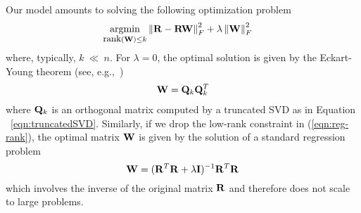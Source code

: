 Our model amounts to solving the following optimization problem
 \begin{align}
\label{eqn:reg-rank}
\underset{\mbox{\footnotesize rank}(\W) \le k}{\mathrm{argmin}} & \left \| \R - \R\W\right \|_F^2 + \lambda \left \|  \W \right \|_F^2
\end{align}
where, typically, $k\ \ll \ n$.
For $\lambda = 0$, the optimal solution is given by the Eckart-Young theorem (see, e.g.,~\citep{halko2011})
   \begin{align}
   \label{eqn:SVDOptimal}
   \mathbf{W} = \mathbf{Q}_k \mathbf{Q}_k^ T
   \end{align}
where  $\mathbf{Q}_k$ is an orthogonal matrix computed by a truncated SVD as in Equation ~\ref{eqn:truncatedSVD}.
Similarly, if we drop the low-rank constraint in (\ref{eqn:reg-rank}), the optimal matrix $\mathbf{W}$ is given by the solution of a standard regression problem
\begin{equation}
\mathbf{W} = (\mathbf{R}^T \mathbf{R} + \lambda \mathbf{I})^{-1} \mathbf{R}^T \mathbf{R}
\end{equation}
which involves the inverse of the original matrix $\mathbf{R}$ and therefore does not scale to large problems.


